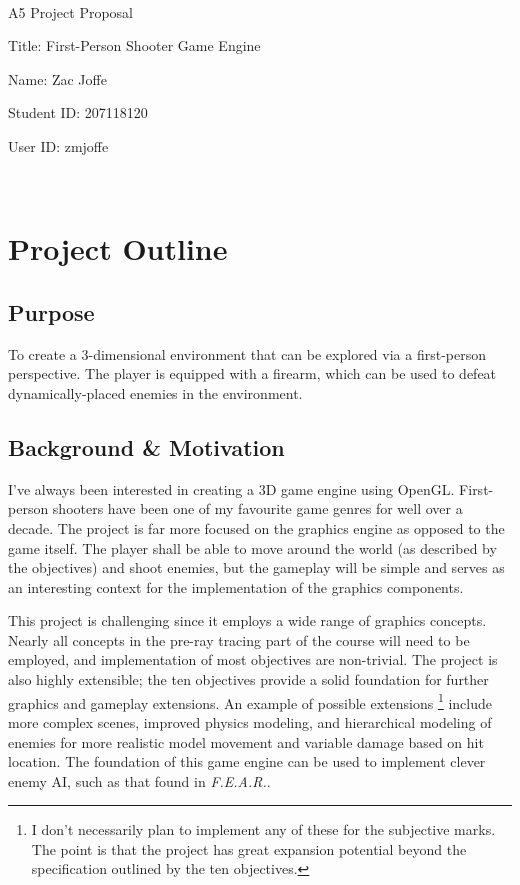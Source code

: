 \documentclass {article}
\begin{document}
~\vfill
\begin{center}
\Large

A5 Project Proposal

Title: First-Person Shooter Game Engine

Name: Zac Joffe

Student ID: 207118120

User ID: zmjoffe

\end{center}
\vfill ~\vfill~
\newpage
\tableofcontents
\section{Project Outline}
\subsection{Purpose}
To create a 3-dimensional environment that can be explored via a first-person perspective. The player is equipped with a firearm, which can be used to defeat dynamically-placed enemies in the environment.

\subsection{Background \& Motivation}

I've always been interested in creating a 3D game engine using OpenGL. First-person shooters have been one of my favourite game genres for well over a decade. The project is far more focused on the graphics engine as opposed to the game itself. The player shall be able to move around the world (as described by the objectives) and shoot enemies, but the gameplay will be simple and serves as an interesting context for the implementation of the graphics components.

This project is challenging since it employs a wide range of graphics concepts. Nearly all concepts in the pre-ray tracing part of the course will need to be employed, and implementation of most objectives are non-trivial. The project is also highly extensible; the ten objectives provide a solid foundation for further graphics and gameplay extensions. An example of possible extensions \footnote{I don't necessarily plan to implement any of these for the subjective marks. The point is that the project has great expansion potential beyond the specification outlined by the ten objectives.} include more complex scenes, improved physics modeling, and hierarchical modeling of enemies for more realistic model movement and variable damage based on hit location. The foundation of this game engine can be used to implement clever enemy AI, such as that found in \textit{F.E.A.R.}.
\end{document}
